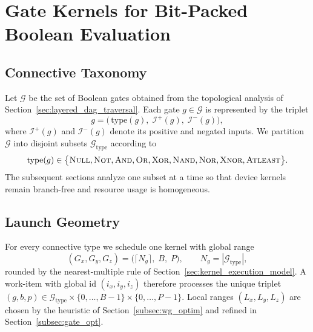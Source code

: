 \chapter{Gate Kernels for Bit\hyp{}Packed Boolean Evaluation}
\label{chap:gate_kernels}

\section{Connective Taxonomy}
\label{sec:gate_taxonomy}

Let $\mathcal{G}$ be the set of Boolean gates obtained from the topological
analysis of Section~\ref{sec:layered_dag_traversal}.  Each gate
$g\in\mathcal{G}$ is represented by the triplet
\[
  g = \bigl(\,\text{type}(g),\; \mathcal{I}^{+}(g),\; \mathcal{I}^{-}(g)\bigr),
\]
where $\mathcal{I}^{+}(g)$ and $\mathcal{I}^{-}(g)$ denote its positive and
negated inputs.  We partition $\mathcal{G}$ into disjoint subsets
$\mathcal{G}_{\mathrm{type}}$ according to
\[
  \text{type}(g)\in\bigl\{\textsc{Null},\textsc{Not},\textsc{And},\textsc{Or},
                   \textsc{Xor},\textsc{Nand},\textsc{Nor},\textsc{Xnor},\textsc{Atleast}\bigr\}.
\]
The subsequent sections analyze one subset at a time so that device kernels
remain branch\hyp{}free and resource usage is homogeneous.

\section{Launch Geometry}
\label{sec:gate_launch_geometry}

For every connective type we schedule one kernel with global range
\[
  (G_x,G_y,G_z)=\bigl(\lceil N_g\rceil,\;B,\;P\bigr),\qquad
  N_g = |\mathcal{G}_{\mathrm{type}}|,
\]
rounded by the nearest\hyp{}multiple rule of
Section~\ref{sec:kernel_execution_model}.  A work\hyp{}item with global id
$(i_x,i_y,i_z)$ therefore processes the unique triplet
\((g,b,p)\in\mathcal{G}_{\mathrm{type}}\times\{0,\dots,B-1\}\times\{0,\dots,P-1\}\).
Local ranges $(L_x,L_y,L_z)$ are chosen by the heuristic of
Section~\ref{subsec:wg_optim} and refined in
Section~\ref{subsec:gate_opt}.

